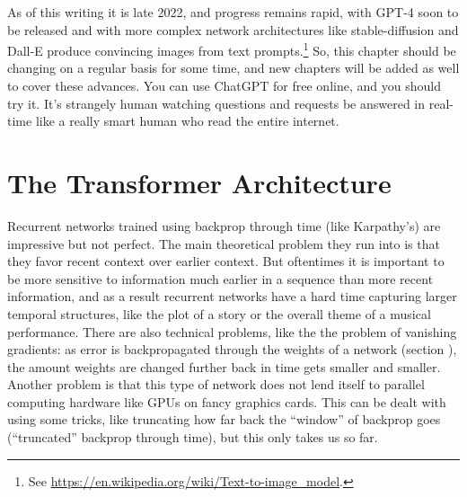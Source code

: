 As of this writing it is late 2022, and progress remains rapid, with GPT-4 soon to be released and with more complex network architectures like stable-diffusion and Dall-E produce convincing images from text prompts.\footnote{See \url{https://en.wikipedia.org/wiki/Text-to-image_model}.} So, this chapter should be changing on a regular basis for some time, and new chapters will be added as well to cover these advances.  You can use ChatGPT for free online, and you should try it. It's strangely human watching questions and requests be answered in real-time like a really smart human who read the entire internet.


\section{The Transformer Architecture}


Recurrent networks trained using backprop through time (like Karpathy's) are impressive but not perfect. The main theoretical problem they run into is that they favor recent context over earlier context.  But oftentimes it is important to be more sensitive to information much earlier in a sequence than more recent information, and as a result recurrent networks have a hard time capturing larger temporal structures,  like the plot of a story or the overall theme of a musical performance. There are also technical problems, like the the problem of vanishing gradients: as error is backpropagated through the weights of a network (section ), the amount weights are changed further back in time gets smaller and smaller. Another problem is that this type of network does not lend itself to parallel computing hardware like GPUs on fancy graphics cards. This can be dealt with using some tricks, like truncating how far back the ``window'' of backprop goes (``truncated'' backprop through time), but this only takes us so far.

